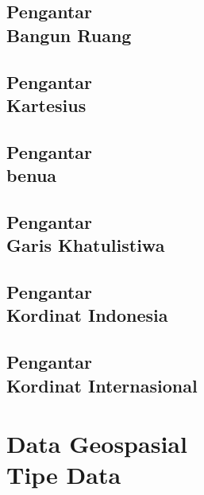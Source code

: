 \documentclass{WileySix}
\begin{document}
\chapter[Bangun Ruang]
{Pengantar\\ Bangun Ruang}


\chapter[Diagram Kartesius]
{Pengantar\\ Kartesius}


\chapter[Benua]
{Pengantar\\ benua}



%



\chapter[Garis Khatulistiwa]
{Pengantar\\ Garis Khatulistiwa}



\chapter[Kordinat Indonesia]
{Pengantar\\ Kordinat Indonesia}


\chapter[Kordinat Internasional]
{Pengantar\\ Kordinat Internasional}



\part[Data Geospasial]
{Data Geospasial\\ Tipe Data}
\end{document}
